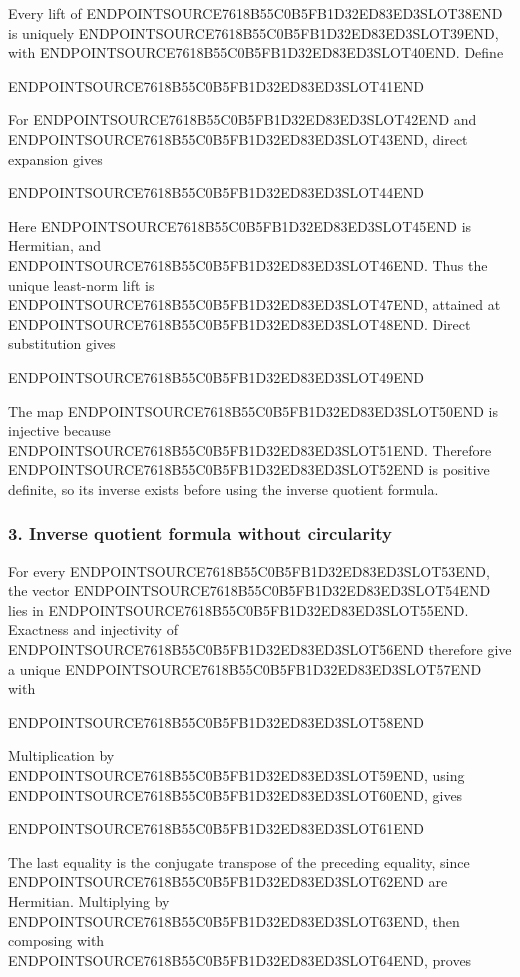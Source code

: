 Every lift of ENDPOINTSOURCE7618B55C0B5FB1D32ED83ED3SLOT38END is uniquely ENDPOINTSOURCE7618B55C0B5FB1D32ED83ED3SLOT39END, with ENDPOINTSOURCE7618B55C0B5FB1D32ED83ED3SLOT40END. Define

ENDPOINTSOURCE7618B55C0B5FB1D32ED83ED3SLOT41END

For ENDPOINTSOURCE7618B55C0B5FB1D32ED83ED3SLOT42END and ENDPOINTSOURCE7618B55C0B5FB1D32ED83ED3SLOT43END, direct expansion gives

ENDPOINTSOURCE7618B55C0B5FB1D32ED83ED3SLOT44END

Here ENDPOINTSOURCE7618B55C0B5FB1D32ED83ED3SLOT45END is Hermitian, and ENDPOINTSOURCE7618B55C0B5FB1D32ED83ED3SLOT46END. Thus the unique least-norm lift is ENDPOINTSOURCE7618B55C0B5FB1D32ED83ED3SLOT47END, attained at ENDPOINTSOURCE7618B55C0B5FB1D32ED83ED3SLOT48END. Direct substitution gives

ENDPOINTSOURCE7618B55C0B5FB1D32ED83ED3SLOT49END

The map ENDPOINTSOURCE7618B55C0B5FB1D32ED83ED3SLOT50END is injective because ENDPOINTSOURCE7618B55C0B5FB1D32ED83ED3SLOT51END. Therefore ENDPOINTSOURCE7618B55C0B5FB1D32ED83ED3SLOT52END is positive definite, so its inverse exists before using the inverse quotient formula.

\subsubsection{3. Inverse quotient formula without circularity}\label{endpoint-variation_review--inverse-quotient-formula-without-circularity}

For every ENDPOINTSOURCE7618B55C0B5FB1D32ED83ED3SLOT53END, the vector ENDPOINTSOURCE7618B55C0B5FB1D32ED83ED3SLOT54END lies in ENDPOINTSOURCE7618B55C0B5FB1D32ED83ED3SLOT55END. Exactness and injectivity of ENDPOINTSOURCE7618B55C0B5FB1D32ED83ED3SLOT56END therefore give a unique ENDPOINTSOURCE7618B55C0B5FB1D32ED83ED3SLOT57END with

ENDPOINTSOURCE7618B55C0B5FB1D32ED83ED3SLOT58END

Multiplication by ENDPOINTSOURCE7618B55C0B5FB1D32ED83ED3SLOT59END, using ENDPOINTSOURCE7618B55C0B5FB1D32ED83ED3SLOT60END, gives

ENDPOINTSOURCE7618B55C0B5FB1D32ED83ED3SLOT61END

The last equality is the conjugate transpose of the preceding equality, since ENDPOINTSOURCE7618B55C0B5FB1D32ED83ED3SLOT62END are Hermitian. Multiplying by ENDPOINTSOURCE7618B55C0B5FB1D32ED83ED3SLOT63END, then composing with ENDPOINTSOURCE7618B55C0B5FB1D32ED83ED3SLOT64END, proves

